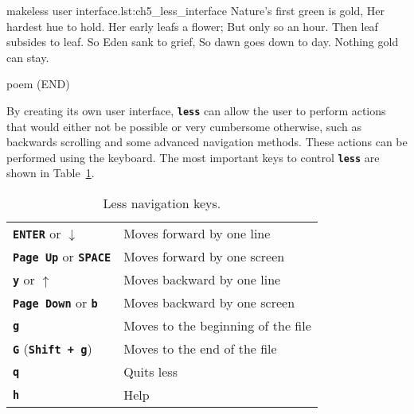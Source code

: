 \begin{source_code_float}{make}{less user interface.}{lst:ch5_less_interface}
Nature's first green is gold,
Her hardest hue to hold.
Her early leafs a flower;
But only so an hour.
Then leaf subsides to leaf.
So Eden sank to grief,
So dawn goes down to day.
Nothing gold can stay.

poem (END)
\end{source_code_float}

By creating its own user interface, \textbf{\texttt{less}} can allow the user to perform actions that would either not be possible or very cumbersome otherwise, such as backwards scrolling and some advanced navigation methods. These actions can be performed using the keyboard. The most important keys to control \textbf{\texttt{less}} are shown in Table~\ref{tab:less_nav_keys}.

\begin{table}[!tbp]
   \myfloatalign
   \begin{tabularx}{\textwidth}{Xp{75mm}} \toprule
     \textbf{\texttt{ENTER}} or $\downarrow$ & Moves forward by one line \\
     \textbf{\texttt{Page Up}} or \textbf{\texttt{SPACE}} & Moves forward by one screen \\
     \textbf{\texttt{y}} or $\uparrow$& Moves backward by one line \\
      \textbf{\texttt{Page Down}} or \textbf{\texttt{b}} & Moves backward by one screen \\
     \textbf{\texttt{g}} & Moves to the beginning of the file \\
     \textbf{\texttt{G}} (\textbf{\texttt{Shift + g}}) & Moves to the end of the file \\
     \textbf{\texttt{q}} &  Quits less \\
     \textbf{\texttt{h}} &  Help \\
   \bottomrule
   \end{tabularx}
\caption{Less navigation keys.}
\label{tab:less_nav_keys}
\end{table}

